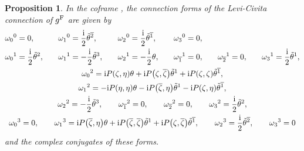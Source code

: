 \documentclass[11pt]{article}
\numberwithin{equation}{section}
\newcommand\ol{\overline}
\numberwithin{equation}{section}
\newtheorem{Proposition}[Theorem]{Proposition}
 { \theoremstyle{definition}
\newtheorem{Definition}[Theorem]{Definition}
\newtheorem*{Notation}{Notation}
\newtheorem{Example}[Theorem]{Example}
\newtheorem{Remark}[Theorem]{Remark} }
\begin{document}
\begin{Proposition}\label{connection}
In the coframe \smash{$\bigl(\tilde\theta^0=\theta, \tilde\theta^1, \tilde\theta^{2}, \tilde\theta^{\ol1}, \tilde\theta^{\ol2}, \tilde\theta^3\bigr)$}, the connection forms of the Levi-Civita connection of $g^{\rm F}$ are given by
\begin{gather*}
\begin{alignedat}{7}
&\omega_0{}^0=0,\qquad&& \omega_1{}^0=\frac{{\rm i}}{2}\tilde\theta^{\ol2},\qquad&& \omega_2{}^0=\frac{{\rm i}}{2}\tilde\theta^{\ol1},\qquad&& \omega_3{}^0=0,& \\
&\omega_0{}^1=\frac{{\rm i}}{2}\tilde\theta^2,\qquad&& \omega_1{}^1=-\frac{{\rm i}}{2}\tilde\theta^3,\qquad&& \omega_2{}^1=-\frac{{\rm i}}{2}\theta,\qquad&& \omega_{\ol1}{}^1=0,\qquad && \omega_{\ol2}{}^1=0,\qquad&& \omega_3{}^1=\frac{{\rm i}}{2}\tilde\theta^1,&
\end{alignedat}
\\
\omega_0{}^2={\rm i}P(\zeta, \eta)\theta+{\rm i}P\bigl(\zeta, \ol\zeta\bigr)\tilde\theta^1+{\rm i}P(\zeta, \zeta)\tilde\theta^{\ol1},\\
\omega_1{}^2=-{\rm i}P(\eta, \eta)\theta-{\rm i}P\bigl(\ol\zeta, \eta\bigr)\tilde\theta^1-{\rm i}P(\zeta, \eta)\tilde\theta^{\ol1}, \\
\omega_2{}^2=-\frac{{\rm i}}{2}\tilde\theta^3, \qquad
\omega_{\ol1}{}^2=0, \qquad \omega_{\ol2}{}^2=0, \qquad \omega_3{}^2=\frac{{\rm i}}{2}\tilde\theta^2, \\
\omega_0{}^3=0, \qquad \omega_1{}^3={\rm i}P\bigl(\ol\zeta, \eta\bigr)\theta+{\rm i}P\bigl(\ol\zeta, \ol\zeta\bigr)\tilde\theta^1+{\rm i}P\bigl(\zeta, \ol\zeta\bigr)\tilde\theta^{\ol1}, \qquad \omega_2{}^3=\frac{{\rm i}}{2}\tilde\theta^{\ol2}, \qquad
\omega_3{}^3=0
\end{gather*}
and the complex conjugates of these forms.
\end{Proposition}
\end{document}
